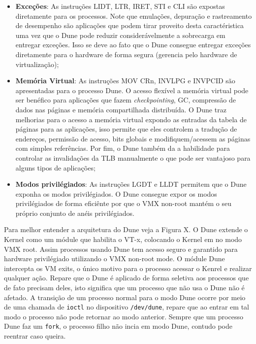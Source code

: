 \begin{itemize}
  \item \textbf{Exceções}:  As instruções LIDT, LTR, IRET, STI e CLI são
        expostas diretamente para os processos. Note que emulações, depuração e
        rastreamento de desempenho são aplicações que podem tirar proveito
        desta caractéristica uma vez que o Dune pode reduzir considerávelmente
        a sobrecarga em entregar exceções. Isso se deve ao fato que o Dune
        consegue entregar exceções diretamente para o hardware de forma segura
        (gerencia pelo hardware de virtualização);
  \item \textbf{Memória Virtual}: As instruções MOV CRn, INVLPG e INVPCID são
        apresentadas para o processo Dune. O acesso flexível a memória virtual
        pode ser benéfico para aplicações que fazem \emph{checkpointing}, GC,
        compressão de dados nas páginas e memória compartilhada distribuída. O
        Dune traz melhorias para o acesso a memória virtual expondo as entradas
        da tabela de páginas para as aplicações, isso permite que eles
        controlem a tradução de endereços, permissão de acesso, bits globais e
        modifiquem/acessem as páginas com simples referências. Por fim, o Dune
        também da a habilidade para controlar as invalidações da TLB
        manualmente o que pode ser vantajoso para alguns tipos de aplicações;
  \item \textbf{Modos privilégiados}: As instruções LGDT e LLDT permitem que o
        Dune exponha os modos privilégiados. O Dune consegue expor os modos
        privilégiados de forma eficiênte por que o VMX non-root mantém o seu
        próprio conjunto de anéis privilégiados.
\end{itemize}

Para melhor entender a arquitetura do Dune veja a Figura X. O Dune extende o
Kernel como um módule que habilita o VT-x, colocando o Kernel em no modo VMX
root. Assim processos usando Dune tem acesso seguro e garantido para hardware
privilégiado utilizando o VMX non-root mode. O módule Dune intercepta os VM
exits, o único motivo para o processo acessar o Kenrel e realizar qualquer
ação. Repare que o Dune é aplicado de forma seletiva aos processos que de fato
precisam deles, isto significa que um processo que não usa o Dune não é
afetado. A transição de um processo normal para o modo Dune ocorre por meio de
uma chamada de \texttt{ioctl} no dispositivo \texttt{/dev/dune}, repare que ao
entrar em tal modo o processo não pode retornar ao modo anterior. Sempre que um
processo Dune faz um \texttt{fork}, o processo filho não incia em modo Dune,
contudo pode reentrar caso queira.

